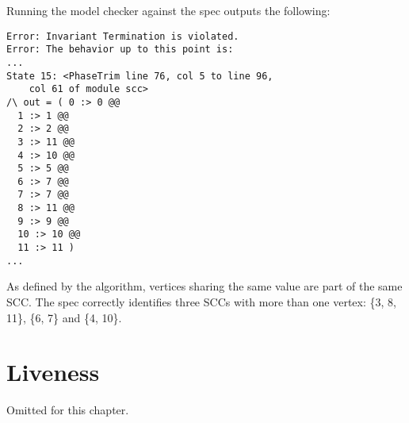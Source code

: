 Running the model checker against the spec outputs the following: 
\begin{verbatim}
Error: Invariant Termination is violated.                               
Error: The behavior up to this point is:      
...
State 15: <PhaseTrim line 76, col 5 to line 96, 
    col 61 of module scc>
/\ out = ( 0 :> 0 @@ 
  1 :> 1 @@  
  2 :> 2 @@ 
  3 :> 11 @@                                                            
  4 :> 10 @@                                                            
  5 :> 5 @@                                                             
  6 :> 7 @@                                                             
  7 :> 7 @@                                                             
  8 :> 11 @@                                                            
  9 :> 9 @@                                                             
  10 :> 10 @@                                                           
  11 :> 11 )   
...
\end{verbatim}

As defined by the algorithm, vertices sharing the same value are part of the
same SCC. The spec correctly identifies three SCCs with more than one vertex:
\{3, 8, 11\}, \{6, 7\} and \{4, 10\}.

\section{Liveness}

Omitted for this chapter.

% 
